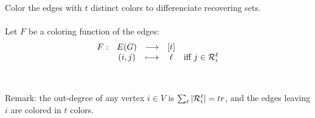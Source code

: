      \begin{frame}
        Color the edges with $t$ distinct colors to differenciate recovering sets. \pause \\~\\
        
        Let $F$ be a coloring function of the edges:
        $$
            \begin{array}{ccccc}
                F: & E(G) & \longrightarrow & [t]  & \\
                   &(i,j) & \longmapsto     & \ell & \mbox{iff } j \in \mathcal{R}_i^\ell
            \end{array}
        $$ \pause \\~\\
        
    Remark: the out-degree of any vertex $i \in V$ is $\sum_\ell \vert \mathcal{R}_i^\ell \vert = tr$, and the edges leaving $i$ are colored in $t$ colors.
    
    \end{frame}    
    
